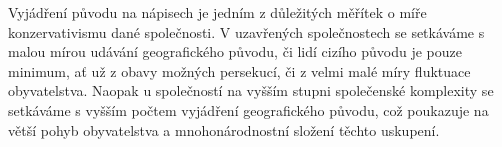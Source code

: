 Vyjádření původu na nápisech je jedním z důležitých měřítek o míře konzervativismu dané společnosti. V uzavřených společnostech se setkáváme s malou mírou udávání geografického původu, či lidí cizího původu je pouze minimum, ať už z obavy možných persekucí, či z velmi malé míry fluktuace obyvatelstva. Naopak u společností na vyšším stupni společenské komplexity se setkáváme s vyšším počtem vyjádření geografického původu, což poukazuje na větší pohyb obyvatelstva a mnohonárodnostní složení těchto uskupení.

